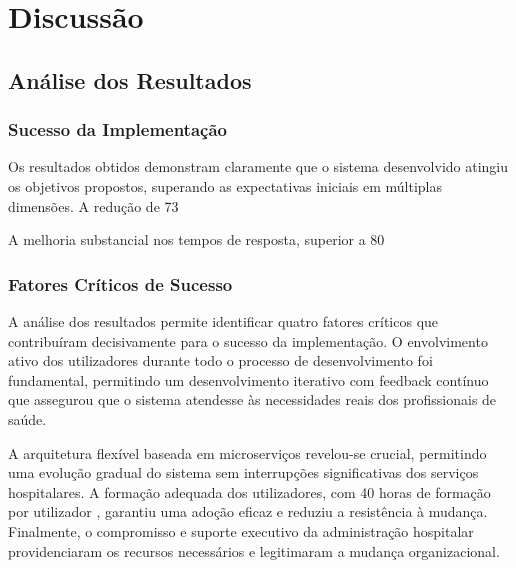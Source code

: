 \chapter{Discussão}

\section{Análise dos Resultados}

\subsection{Sucesso da Implementação}

Os resultados obtidos demonstram claramente que o sistema desenvolvido atingiu os objetivos propostos, superando as expectativas iniciais em múltiplas dimensões. A redução de 73%

A melhoria substancial nos tempos de resposta, superior a 80%

\subsection{Fatores Críticos de Sucesso}

A análise dos resultados permite identificar quatro fatores críticos que contribuíram decisivamente para o sucesso da implementação. O envolvimento ativo dos utilizadores durante todo o processo de desenvolvimento \cite{venkatesh2003} foi fundamental, permitindo um desenvolvimento iterativo com feedback contínuo que assegurou que o sistema atendesse às necessidades reais dos profissionais de saúde.

A arquitetura flexível baseada em microserviços \cite{newman2021} revelou-se crucial, permitindo uma evolução gradual do sistema sem interrupções significativas dos serviços hospitalares. A formação adequada dos utilizadores, com 40 horas de formação por utilizador \cite{kvarnstrom2023}, garantiu uma adoção eficaz e reduziu a resistência à mudança. Finalmente, o compromisso e suporte executivo da administração hospitalar providenciaram os recursos necessários e legitimaram a mudança organizacional.

